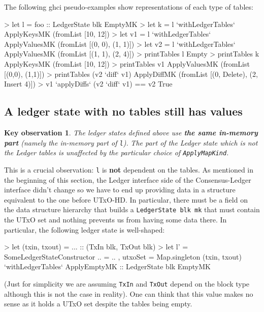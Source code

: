 \documentclass[11pt,a4paper]{article}
\newcommand{\htt}[1]{\texttt{#1}}
\theoremstyle{definition}
\newtheorem{observation}{Key observation}
\begin{document}
The following ghci pseudo-examples show representations of each type of tables:

\begin{code}
  > let l  = foo :: LedgerState blk EmptyMK
  > let k  = l `withLedgerTables` ApplyKeysMK (fromList [10, 12])
  > let v1 = l `withLedgerTables` ApplyValuesMK (fromList [(0, 0), (1, 1)])
  > let v2 = l `withLedgerTables` ApplyValuesMK (fromList [(1, 1), (2, 4)])
  > printTables l
  Empty
  > printTables k
  ApplyKeysMK   (fromList [10, 12])
  > printTables v1
  ApplyValuesMK (fromList [(0,0), (1,1)])
  > printTables (v2 `diff` v1)
  ApplyDiffMK   (fromList [(0, Delete), (2, Insert 4)])
  > v1 `applyDiffs` (v2 `diff` v1) == v2
  True
\end{code}

\subsection{A ledger state with no tables still has values}
\begin{observation}
  \emph{The ledger states defined above use \textbf{the same in-memory part}
    (namely the in-memory part of \texttt{l}).} \emph{The part of the Ledger
    state which is not the Ledger tables is unaffected by the particular choice
    of \texttt{ApplyMapKind}.}
\end{observation}

This is a crucial observation: \texttt{l} is \textbf{not} dependent on the
tables. As mentioned in the beginning of this section, the Ledger interface side
of the Consensus-Ledger interface didn't change so we have to end up providing
data in a structure equivalent to the one before UTxO-HD. In particular, there
must be a field on the data structure hierarchy that builds a
\htt{LedgerState blk mk} that must contain the UTxO set and nothing prevents
us from having some data there. In particular, the following ledger state is well-shaped:

\begin{code}
  > let (txin, txout) = ... :: (TxIn blk, TxOut blk)
  > let l' = SomeLedgerStateConstructor {
      .. = {
          ..
        , utxoSet = Map.singleton (txin, txout)
        }
      } `withLedgerTables` ApplyEmptyMK :: LedgerState blk EmptyMK
\end{code}

(Just for simplicity we are assuming \htt{TxIn} and \htt{TxOut} depend on
the block type although this is not the case in reality). One can think that
this value makes no sense as it holds a UTxO set despite the tables being empty.
\end{document}
